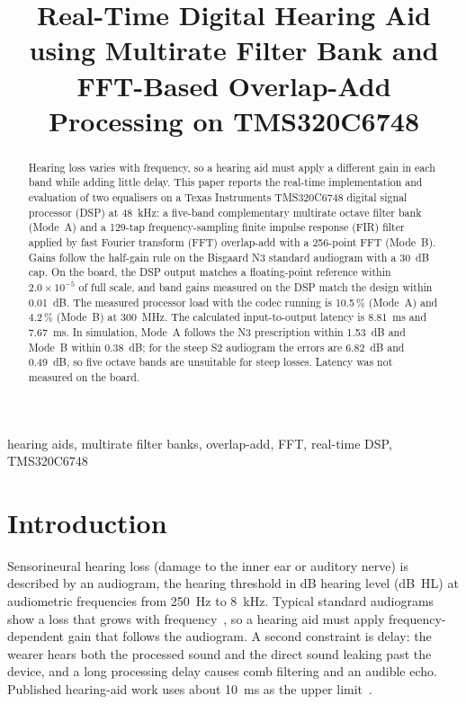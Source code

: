 \documentclass[conference]{IEEEtran}
\begin{document}
\title{Real-Time Digital Hearing Aid using Multirate Filter Bank and FFT-Based Overlap-Add Processing on TMS320C6748}

\author{
}

\maketitle

\begin{abstract}
Hearing loss varies with frequency, so a hearing aid must apply a different gain in each band while adding little delay. This paper reports the real-time implementation and evaluation of two equalisers on a Texas Instruments TMS320C6748 digital signal processor (DSP) at 48~kHz: a five-band complementary multirate octave filter bank (Mode~A) and a 129-tap frequency-sampling finite impulse response (FIR) filter applied by fast Fourier transform (FFT) overlap-add with a 256-point FFT (Mode~B). Gains follow the half-gain rule on the Bisgaard N3 standard audiogram with a 30~dB cap. On the board, the DSP output matches a floating-point reference within $2.0\times10^{-5}$ of full scale, and band gains measured on the DSP match the design within 0.01~dB. The measured processor load with the codec running is 10.5\,\% (Mode~A) and 4.2\,\% (Mode~B) at 300~MHz. The calculated input-to-output latency is 8.81~ms and 7.67~ms. In simulation, Mode~A follows the N3 prescription within 1.53~dB and Mode~B within 0.38~dB; for the steep S2 audiogram the errors are 6.82~dB and 0.49~dB, so five octave bands are unsuitable for steep losses. Latency was not measured on the board.
\end{abstract}

\begin{IEEEkeywords}
hearing aids, multirate filter banks, overlap-add, FFT, real-time DSP, TMS320C6748
\end{IEEEkeywords}

\section{Introduction}
Sensorineural hearing loss (damage to the inner ear or auditory nerve) is described by an audiogram, the hearing threshold in dB hearing level (dB~HL) at audiometric frequencies from 250~Hz to 8~kHz. Typical standard audiograms show a loss that grows with frequency~\cite{bisgaard2010}, so a hearing aid must apply frequency-dependent gain that follows the audiogram. A second constraint is delay: the wearer hears both the processed sound and the direct sound leaking past the device, and a long processing delay causes comb filtering and an audible echo. Published hearing-aid work uses about 10~ms as the upper limit~\cite{sokolova2021,kayser2022,yang2016}.
\end{document}
